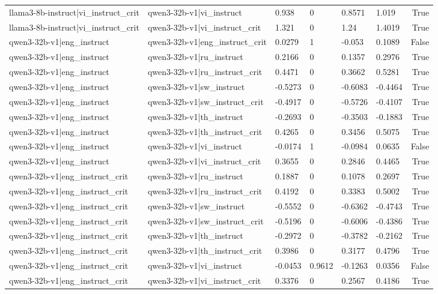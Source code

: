 \begin{table}
\begin{tabular}{llllllr}
llama3-8b-instruct|vi_instruct_crit & qwen3-32b-v1|vi_instruct & 0.938 & 0 & 0.8571 & 1.019 & True \\
llama3-8b-instruct|vi_instruct_crit & qwen3-32b-v1|vi_instruct_crit & 1.321 & 0 & 1.24 & 1.4019 & True \\
qwen3-32b-v1|eng_instruct & qwen3-32b-v1|eng_instruct_crit & 0.0279 & 1 & -0.053 & 0.1089 & False \\
qwen3-32b-v1|eng_instruct & qwen3-32b-v1|ru_instruct & 0.2166 & 0 & 0.1357 & 0.2976 & True \\
qwen3-32b-v1|eng_instruct & qwen3-32b-v1|ru_instruct_crit & 0.4471 & 0 & 0.3662 & 0.5281 & True \\
qwen3-32b-v1|eng_instruct & qwen3-32b-v1|sw_instruct & -0.5273 & 0 & -0.6083 & -0.4464 & True \\
qwen3-32b-v1|eng_instruct & qwen3-32b-v1|sw_instruct_crit & -0.4917 & 0 & -0.5726 & -0.4107 & True \\
qwen3-32b-v1|eng_instruct & qwen3-32b-v1|th_instruct & -0.2693 & 0 & -0.3503 & -0.1883 & True \\
qwen3-32b-v1|eng_instruct & qwen3-32b-v1|th_instruct_crit & 0.4265 & 0 & 0.3456 & 0.5075 & True \\
qwen3-32b-v1|eng_instruct & qwen3-32b-v1|vi_instruct & -0.0174 & 1 & -0.0984 & 0.0635 & False \\
qwen3-32b-v1|eng_instruct & qwen3-32b-v1|vi_instruct_crit & 0.3655 & 0 & 0.2846 & 0.4465 & True \\
qwen3-32b-v1|eng_instruct_crit & qwen3-32b-v1|ru_instruct & 0.1887 & 0 & 0.1078 & 0.2697 & True \\
qwen3-32b-v1|eng_instruct_crit & qwen3-32b-v1|ru_instruct_crit & 0.4192 & 0 & 0.3383 & 0.5002 & True \\
qwen3-32b-v1|eng_instruct_crit & qwen3-32b-v1|sw_instruct & -0.5552 & 0 & -0.6362 & -0.4743 & True \\
qwen3-32b-v1|eng_instruct_crit & qwen3-32b-v1|sw_instruct_crit & -0.5196 & 0 & -0.6006 & -0.4386 & True \\
qwen3-32b-v1|eng_instruct_crit & qwen3-32b-v1|th_instruct & -0.2972 & 0 & -0.3782 & -0.2162 & True \\
qwen3-32b-v1|eng_instruct_crit & qwen3-32b-v1|th_instruct_crit & 0.3986 & 0 & 0.3177 & 0.4796 & True \\
qwen3-32b-v1|eng_instruct_crit & qwen3-32b-v1|vi_instruct & -0.0453 & 0.9612 & -0.1263 & 0.0356 & False \\
qwen3-32b-v1|eng_instruct_crit & qwen3-32b-v1|vi_instruct_crit & 0.3376 & 0 & 0.2567 & 0.4186 & True \\

\end{tabular}
\end{table}
